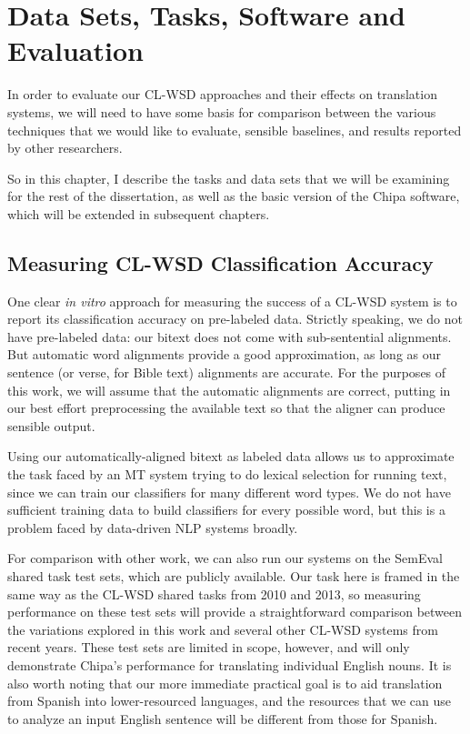 \chapter{Data Sets, Tasks, Software and Evaluation}
\label{chap:evaluation}
In order to evaluate our CL-WSD approaches and their effects on translation
systems, we will need to have some basis for comparison between the various
techniques that we would like to evaluate, sensible baselines, and results
reported by other researchers.

So in this chapter, I describe the tasks and data sets that we will be
examining for the rest of the dissertation, as well as the basic version of the
Chipa software, which will be extended in subsequent chapters.

\section{Measuring CL-WSD Classification Accuracy}
One clear \emph{in vitro} approach for measuring the success of a CL-WSD system
is to report its classification accuracy on pre-labeled data. Strictly
speaking, we do not have pre-labeled data: our bitext does not
come with sub-sentential alignments. But automatic word alignments provide
a good approximation, as long as our sentence (or verse, for Bible text)
alignments are accurate. For the purposes of this work, we will assume that the
automatic alignments are correct, putting in our best effort preprocessing
the available text so that the aligner can produce sensible output.

Using our automatically-aligned bitext as labeled data allows us to approximate
the task faced by an MT system trying to do lexical selection for running text,
since we can train our classifiers for many different word types. We do not
have sufficient training data to build classifiers for every possible word, but
this is a problem faced by data-driven NLP systems broadly.

For comparison with other work, we can also run our systems on the SemEval
shared task test sets, which are publicly available. Our task here is framed in
the same way as the CL-WSD shared tasks from 2010 and 2013, so measuring
performance on these test sets will provide a straightforward comparison
between the variations explored in this work and several other CL-WSD systems
from recent years.  These test sets are limited in scope, however, and will
only demonstrate Chipa's performance for translating individual English nouns.
It is also worth noting that our more immediate practical goal is to aid
translation from Spanish into lower-resourced languages, and the resources that
we can use to analyze an input English sentence will be different from those
for Spanish.

